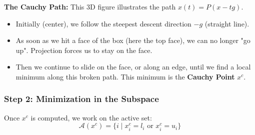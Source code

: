 \begin{center}
\end{center}

\begin{figureexplanation}
\textbf{The Cauchy Path:}
This 3D figure illustrates the path $x(t) = P(x - tg)$.
\begin{itemize}
    \item Initially (center), we follow the steepest descent direction $-g$ (straight line).
    \item As soon as we hit a face of the box (here the top face), we can no longer "go up". Projection forces us to stay on the face.
    \item Then we continue to slide on the face, or along an edge, until we find a local minimum along this broken path. This minimum is the \textbf{Cauchy Point} $x^c$.
\end{itemize}
\end{figureexplanation}

\subsubsection{Step 2: Minimization in the Subspace}

Once $x^c$ is computed, we work on the active set:
\begin{equation}
    \mathcal{A}(x^c) = \{ i \mid x_i^c = l_i \text{ or } x_i^c = u_i \}
\end{equation}

